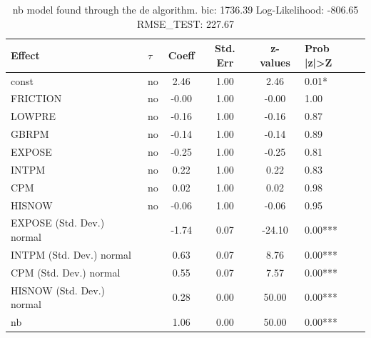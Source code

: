 \begin{table}
	\caption{nb model found through the de algorithm. bic: 1736.39 Log-Likelihood: -806.65 RMSE_TEST: 227.67}
	\begin{center}
		\begin{tabular}{|l|l|c|c|c|l|}
			\hline
			Effect & $\tau$ & Coeff & Std. Err & z-values & Prob |z|>Z \\
			\hline
			const & no & 2.46 & 1.00 & 2.46 & 0.01* \\
			\hline
			FRICTION & no & -0.00 & 1.00 & -0.00 & 1.00 \\
			\hline
			LOWPRE & no & -0.16 & 1.00 & -0.16 & 0.87 \\
			\hline
			GBRPM & no & -0.14 & 1.00 & -0.14 & 0.89 \\
			\hline
			EXPOSE & no & -0.25 & 1.00 & -0.25 & 0.81 \\
			\hline
			INTPM & no & 0.22 & 1.00 & 0.22 & 0.83 \\
			\hline
			CPM & no & 0.02 & 1.00 & 0.02 & 0.98 \\
			\hline
			HISNOW & no & -0.06 & 1.00 & -0.06 & 0.95 \\
			\hline
			EXPOSE (Std. Dev.) normal &  & -1.74 & 0.07 & -24.10 & 0.00*** \\
			\hline
			INTPM (Std. Dev.) normal &  & 0.63 & 0.07 & 8.76 & 0.00*** \\
			\hline
			CPM (Std. Dev.) normal &  & 0.55 & 0.07 & 7.57 & 0.00*** \\
			\hline
			HISNOW (Std. Dev.) normal &  & 0.28 & 0.00 & 50.00 & 0.00*** \\
			\hline
			nb &  & 1.06 & 0.00 & 50.00 & 0.00*** \\
			\hline
		\end{tabular}
	\end{center}
\end{table}